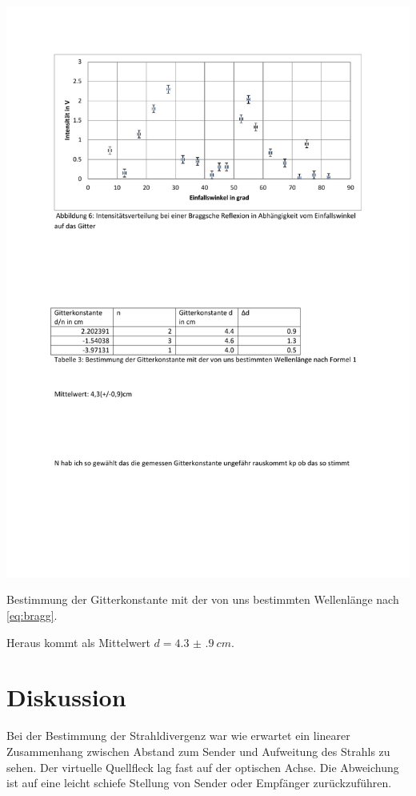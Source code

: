 \begin{table}[H]
\centering
\includegraphics[width=\linewidth, trim=2.2cm 11.5cm 5.6cm 15.6cm, clip=true]{res/Nr6.pdf}
\caption{Bestimmung der Gitterkonstante mit der von uns bestimmten Wellenlänge nach \cref{eq:bragg}.}
\label{tab:bragg}
\end{table}

Heraus kommt als Mittelwert $d=\SI{4.3(9)}{cm}$.
\section{Diskussion}
Bei der Bestimmung der Strahldivergenz war wie erwartet ein linearer Zusammenhang zwischen Abstand zum Sender und Aufweitung des Strahls zu sehen. Der virtuelle Quellfleck lag fast auf der optischen Achse. Die Abweichung ist auf eine leicht schiefe Stellung von Sender oder Empfänger zurückzuführen. 


